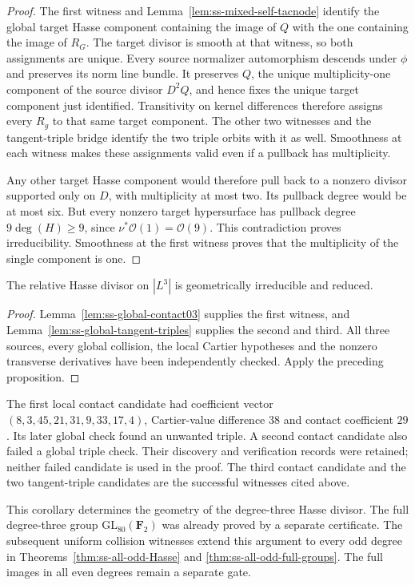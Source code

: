 \begin{proof}
The first witness and Lemma~\ref{lem:ss-mixed-self-tacnode} identify
the global target Hasse component containing the image of $Q$ with
the one containing the image of $R_G$. The target divisor is smooth
at that witness, so both assignments are unique. Every source
normalizer automorphism descends under $\phi$ and preserves its
norm line bundle. It preserves $Q$, the unique multiplicity-one
component of the source divisor $D^2Q$, and hence fixes the unique
target component just identified. Transitivity on kernel differences
therefore assigns every $R_g$ to that same target component.
The other two witnesses and the tangent-triple bridge identify the
two triple orbits with it as well. Smoothness at each witness makes
these assignments valid even if a pullback has multiplicity.

Any other target Hasse component would therefore pull back to a
nonzero divisor supported only on $D$, with multiplicity at most two.
Its pullback degree would be at most six. But every nonzero target
hypersurface has pullback degree $9\deg(H)\ge9$, since
$\nu^*\mathcal O(1)=\mathcal O(9)$. This contradiction proves
irreducibility. Smoothness at the first witness proves that the
multiplicity of the single component is one.
\end{proof}

\begin{corollary}
\label{cor:ss-degree3-hasse-irreducible}
The relative Hasse divisor on $|L^3|$ is geometrically irreducible
and reduced.
\end{corollary}
\begin{proof}
Lemma~\ref{lem:ss-global-contact03} supplies the first witness, and
Lemma~\ref{lem:ss-global-tangent-triples} supplies the second and
third. All three sources, every global collision, the local
Cartier hypotheses and the nonzero transverse derivatives have
been independently checked. Apply the preceding proposition.
\end{proof}

\begin{remark}\label{auto:A_monodromy:c2d3a12ed050}

The first local contact candidate had coefficient vector
$(8,3,45,21,31,9,33,17,4)$, Cartier-value difference $38$ and
contact coefficient $29$. Its later global check found an unwanted
triple. A second contact candidate also failed a global triple
check. Their discovery and verification records were retained;
neither failed candidate is used in the proof. The third contact
candidate and the two tangent-triple candidates are the successful
witnesses cited above.

This corollary determines the geometry of the degree-three Hasse
divisor. The full degree-three group $\mathrm{GL}_{80}(\mathbf F_2)$
was already proved by a separate certificate. The subsequent uniform collision witnesses extend this argument to
every odd degree in Theorems~\ref{thm:ss-all-odd-Hasse} and
\ref{thm:ss-all-odd-full-groups}. The full images in all even
degrees remain a separate gate.
\end{remark}


